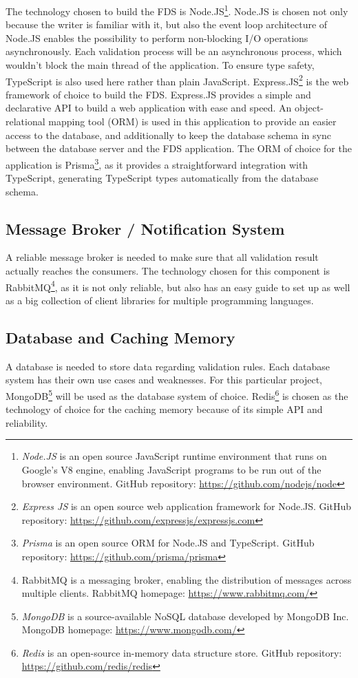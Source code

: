 The technology chosen to build the FDS is Node.JS\footnote{\emph{Node.JS} is an open source JavaScript runtime environment that runs on Google's V8 engine, enabling JavaScript programs to be run out of the browser environment. GitHub repository: \url{https://github.com/nodejs/node}}. Node.JS is chosen not only because the writer is familiar with it, but also the event loop architecture of Node.JS enables the possibility to perform non-blocking I/O operations asynchronously. Each validation process will be an asynchronous process, which wouldn't block the main thread of the application. To ensure type safety, TypeScript is also used here rather than plain JavaScript. Express.JS\footnote{\emph{Express JS} is an open source web application framework for Node.JS. GitHub repository: \url{https://github.com/expressjs/expressjs.com}} is the web framework of choice to build the FDS. Express.JS provides a simple and declarative API to build a web application with ease and speed.
An object-relational mapping tool (ORM) is used in this application to provide an easier access to the database, and additionally to keep the database schema in sync between the database server and the FDS application. The ORM of choice for the application is Prisma\footnote{\emph{Prisma} is an open source ORM for Node.JS and TypeScript. GitHub repository: \url{https://github.com/prisma/prisma}}, as it provides a straightforward integration with TypeScript, generating TypeScript types automatically from the database schema.

 \subsection{Message Broker / Notification System}
 A reliable message broker is needed to make sure that all validation result actually reaches the consumers. The technology chosen for this component is RabbitMQ\footnote{RabbitMQ is a messaging broker, enabling the distribution of messages across multiple clients. RabbitMQ homepage: \url{https://www.rabbitmq.com/}}, as it is not only reliable, but also has an easy guide to set up as well as a big collection of client libraries for multiple programming languages.

 \subsection{Database and Caching Memory}
 A database is needed to store data regarding validation rules. Each database system has their own use cases and weaknesses. For this particular project, MongoDB\footnote{\emph{MongoDB} is a source-available NoSQL database developed by MongoDB Inc. MongoDB homepage: \url{https://www.mongodb.com/}} will be used as the database system of choice. Redis\footnote{\emph{Redis} is an open-source in-memory data structure store. GitHub repository: \url{https://github.com/redis/redis}} is chosen as the technology of choice for the caching memory because of its simple API and reliability. 